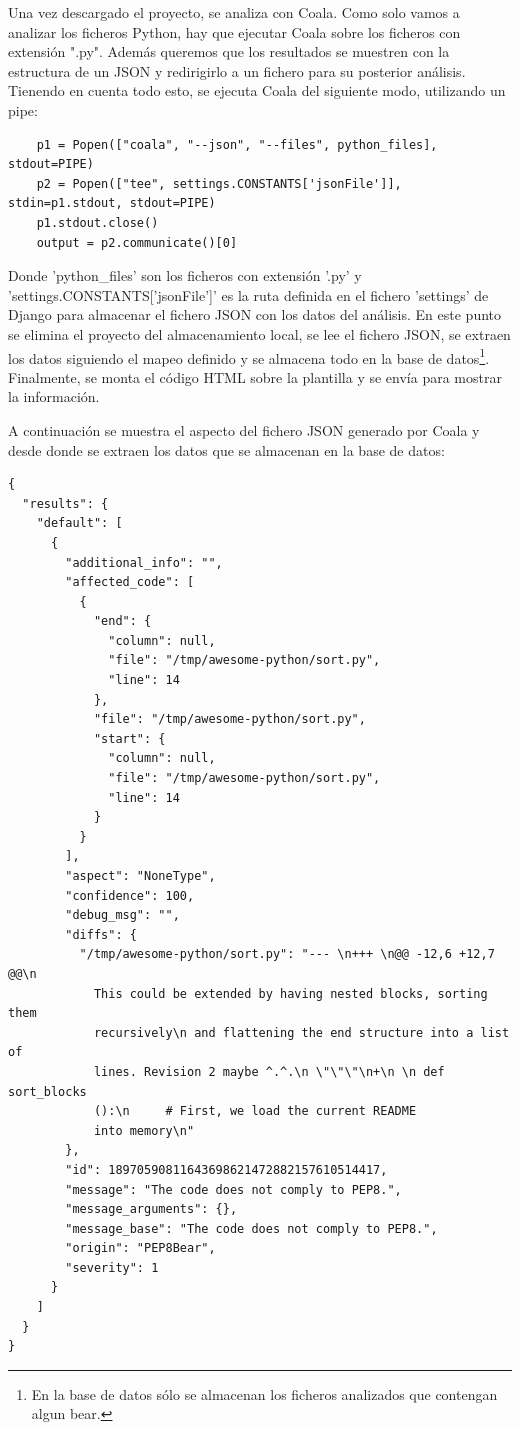 \documentclass[a4paper, 12pt]{book}
\begin{document}
Una vez descargado el proyecto, se analiza con Coala. Como solo vamos a analizar los ficheros Python, hay que ejecutar Coala sobre los ficheros con extensión ".py". Además queremos que los resultados se muestren con la estructura de un JSON y redirigirlo a un fichero para su posterior análisis. Tienendo en cuenta todo esto, se ejecuta Coala del siguiente modo, utilizando un pipe:

{\footnotesize
\begin{verbatim}
    p1 = Popen(["coala", "--json", "--files", python_files], stdout=PIPE)
    p2 = Popen(["tee", settings.CONSTANTS['jsonFile']], stdin=p1.stdout, stdout=PIPE)
    p1.stdout.close()
    output = p2.communicate()[0]
\end{verbatim}
}

Donde 'python\_files' son los ficheros con extensión '.py' y 'settings.CONSTANTS['jsonFile']' es la ruta definida en el fichero 'settings' de Django para almacenar el fichero JSON con los datos del análisis. En este punto se elimina el proyecto del almacenamiento local, se lee el fichero JSON, se extraen los datos siguiendo el mapeo definido y se almacena todo en la base de datos\footnote{En la base de datos sólo se almacenan los ficheros analizados que contengan algun bear.}. Finalmente, se monta el código HTML sobre la plantilla y se envía para mostrar la información.

A continuación se muestra el aspecto del fichero JSON generado por Coala y desde donde se extraen los datos que se almacenan en la base de datos:

{\footnotesize
\begin{verbatim}
{
  "results": {
    "default": [
      {
        "additional_info": "",
        "affected_code": [
          {
            "end": {
              "column": null,
              "file": "/tmp/awesome-python/sort.py",
              "line": 14
            },
            "file": "/tmp/awesome-python/sort.py",
            "start": {
              "column": null,
              "file": "/tmp/awesome-python/sort.py",
              "line": 14
            }
          }
        ],
        "aspect": "NoneType",
        "confidence": 100,
        "debug_msg": "",
        "diffs": {
          "/tmp/awesome-python/sort.py": "--- \n+++ \n@@ -12,6 +12,7 @@\n     
            This could be extended by having nested blocks, sorting them 
            recursively\n and flattening the end structure into a list of 
            lines. Revision 2 maybe ^.^.\n \"\"\"\n+\n \n def sort_blocks
            ():\n     # First, we load the current README 
            into memory\n"
        },
        "id": 18970590811643698621472882157610514417,
        "message": "The code does not comply to PEP8.",
        "message_arguments": {},
        "message_base": "The code does not comply to PEP8.",
        "origin": "PEP8Bear",
        "severity": 1
      }
    ]
  }
}
\end{verbatim}
}
\end{document}
